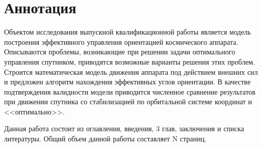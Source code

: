 \chapter*{Аннотация}
\noindent\indent Объектом исследования выпускной квалификационной работы является
модель построения эффективного управления ориентацией космического аппарата.
Описываются проблемы, возникающие при решении задачи оптимального управления
спутником, приводятся возможные варианты решения этих проблем. Строится
математическая модель движения аппарата под действием внешних сил и предложен
алгоритм нахождения эффективных углов ориентации. В качестве подтверждения
валидности модели приводится численное сравнение результатов при движении спутника
со стабилизацией по орбитальной системе координат и <<оптимально>>.
\par Данная работа состоит из оглавления, введения, 3 глав, заключения и списка
литературы. Общий объем данной работы составляет N страниц.
